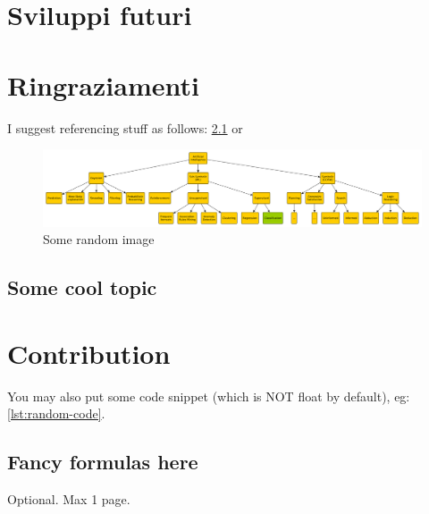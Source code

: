 \documentclass[12pt,a4paper,openright,twoside]{book}
\begin{document}
\chapter{Sviluppi futuri}
\chapter{Ringraziamenti}

I suggest referencing stuff as follows: \cref{fig:random-image} or 

\begin{figure}
    \centering
    \includegraphics[width=0.8\linewidth]{figures/random-image.pdf}
    \caption{Some random image}
    \label{fig:random-image}
\end{figure}

\section{Some cool topic}

\chapter{Contribution}

You may also put some code snippet (which is NOT float by default), eg: \cref{lst:random-code}.



\section{Fancy formulas here}


\backmatter

\nocite{*} %
\printglossary[type=\acronymtype]
\printglossary
\printbibliography

\begin{acknowledgements} %
Optional. Max 1 page.
\end{acknowledgements}
\end{document}
